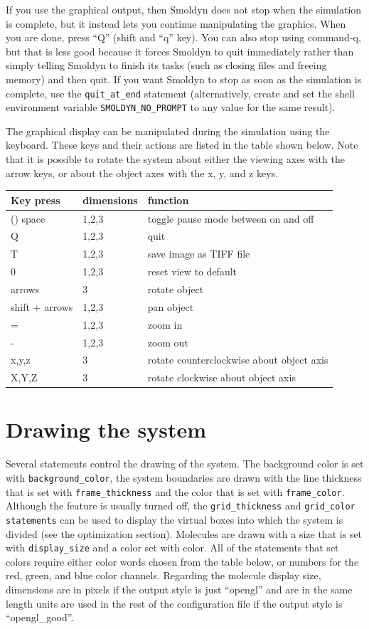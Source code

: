 \documentclass {book}
\newcommand {\ttt} {\texttt}
\begin{document}
If you use the graphical output, then Smoldyn does not stop when the simulation is complete, but it instead lets you continue manipulating the graphics. When you are done, press ``Q'' (shift and ``q'' key). You can also stop using command-q, but that is less good because it forces Smoldyn to quit immediately rather than simply telling Smoldyn to finish its tasks (such as closing files and freeing memory) and then quit. If you want Smoldyn to stop as soon as the simulation is complete, use the \ttt{quit\_at\_end} statement (alternatively, create and set the shell environment variable \ttt{SMOLDYN\_NO\_PROMPT} to any value for the same result).

The graphical display can be manipulated during the simulation using the keyboard. These keys and their actions are listed in the table shown below. Note that it is possible to rotate the system about either the viewing axes with the arrow keys, or about the object axes with the x, y, and z keys.

\begin{longtable}[c]{lll}
Key press & dimensions & function\\
\hline()
space & 1,2,3 & toggle pause mode between on and off\\
Q & 1,2,3 & quit\\
T & 1,2,3 & save image as TIFF file\\
0 & 1,2,3 & reset view to default\\
arrows & 3 & rotate object\\
shift + arrows & 1,2,3 & pan object\\
= & 1,2,3 & zoom in\\
- & 1,2,3 & zoom out\\
x,y,z & 3 & rotate counterclockwise about object axis\\
X,Y,Z & 3 & rotate clockwise about object axis\\
\end{longtable}

\section{Drawing the system}

Several statements control the drawing of the system. The background color is set with \ttt{background\_color}, the system boundaries are drawn with the line thickness that is set with \ttt{frame\_thickness} and the color that is set with \ttt{frame\_color}. Although the feature is usually turned off, the \ttt{grid\_thickness} and \ttt{grid\_color statements} can be used to display the virtual boxes into which the system is divided (see the optimization section). Molecules are drawn with a size that is set with \ttt{display\_size} and a color set with color. All of the statements that set colors require either color words chosen from the table below, or numbers for the red, green, and blue color channels. Regarding the molecule display size, dimensions are in pixels if the output style is just ``opengl'' and are in the same length units are used in the rest of the configuration file if the output style is ``opengl\_good''.
\end{document}
